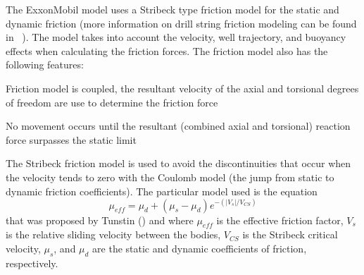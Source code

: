 The ExxonMobil model uses a Stribeck type friction model for the static and dynamic friction (more information on drill string friction modeling can be found in ~\cite{ref:cayeux2020a}).  The model takes into account the velocity, well trajectory, and buoyancy effects when calculating the friction forces. The friction model also has the following features:
\begin{bulletedlist}
    \item Friction model is coupled, the resultant velocity of the axial and torsional degrees of freedom are use to determine the friction force
    \item No movement occurs until the resultant (combined axial and torsional) reaction force surpasses the static limit
\end{bulletedlist}

The Stribeck friction model is used to avoid the discontinuities that occur when the velocity tends to zero with the Coulomb model (the jump from static to dynamic friction coefficients). The particular model used is the equation
\begin{equation}
	\label{Stribeck velocity}
	\mu_{eff} = \mu_{d} + (\mu_{s} - \mu_{d}) e^{-(|V_s|/V_{CS})}
\end{equation}
that was proposed by Tunstin (\cite{ref:tustin1947a}) and where $\mu_{eff}$ is the effective friction factor, $V_s$ is the relative sliding velocity between the bodies, $V_{CS}$ is the Stribeck critical velocity, $\mu_{s}$, and $\mu_{d}$ are the static and dynamic coefficients of friction, respectively.

